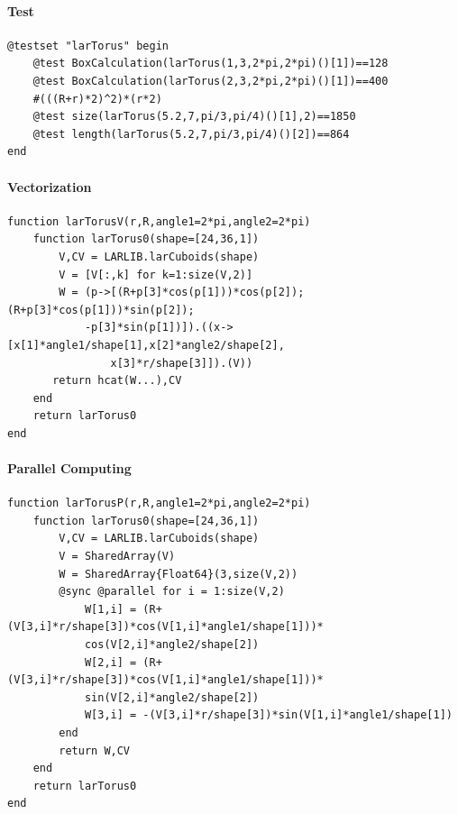 \documentclass{article}
\begin{document}
\paragraph{Test}
\begin{Verbatim}
@testset "larTorus" begin
	@test BoxCalculation(larTorus(1,3,2*pi,2*pi)()[1])==128
	@test BoxCalculation(larTorus(2,3,2*pi,2*pi)()[1])==400
	#(((R+r)*2)^2)*(r*2)
	@test size(larTorus(5.2,7,pi/3,pi/4)()[1],2)==1850
	@test length(larTorus(5.2,7,pi/3,pi/4)()[2])==864
end
\end{Verbatim}

\paragraph{Vectorization}

\begin{verbatim}
function larTorusV(r,R,angle1=2*pi,angle2=2*pi)
    function larTorus0(shape=[24,36,1])
        V,CV = LARLIB.larCuboids(shape)
        V = [V[:,k] for k=1:size(V,2)]
        W = (p->[(R+p[3]*cos(p[1]))*cos(p[2]);(R+p[3]*cos(p[1]))*sin(p[2]);
            -p[3]*sin(p[1])]).((x->[x[1]*angle1/shape[1],x[2]*angle2/shape[2], 
                x[3]*r/shape[3]]).(V))
       return hcat(W...),CV
    end
    return larTorus0
end
\end{verbatim}

\paragraph{Parallel Computing}
\begin{Verbatim}
function larTorusP(r,R,angle1=2*pi,angle2=2*pi)
    function larTorus0(shape=[24,36,1])
        V,CV = LARLIB.larCuboids(shape)
        V = SharedArray(V)
        W = SharedArray{Float64}(3,size(V,2))           
        @sync @parallel for i = 1:size(V,2)
            W[1,i] = (R+(V[3,i]*r/shape[3])*cos(V[1,i]*angle1/shape[1]))*
            cos(V[2,i]*angle2/shape[2])       
            W[2,i] = (R+(V[3,i]*r/shape[3])*cos(V[1,i]*angle1/shape[1]))*
            sin(V[2,i]*angle2/shape[2])
            W[3,i] = -(V[3,i]*r/shape[3])*sin(V[1,i]*angle1/shape[1])
        end
        return W,CV
    end
    return larTorus0
end 
\end{Verbatim}
\end{document}
